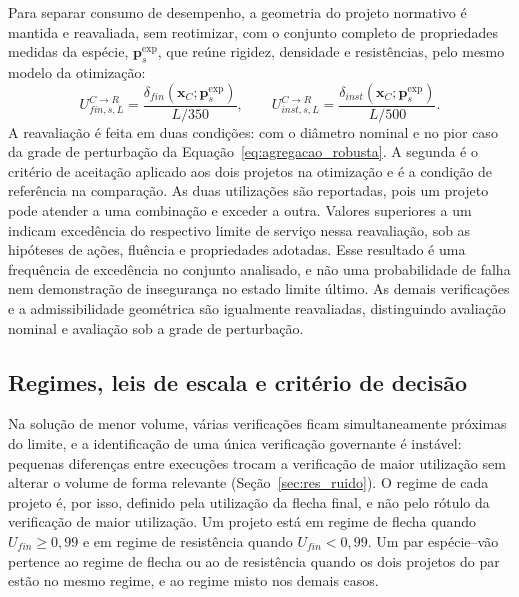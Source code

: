 Para separar consumo de desempenho, a geometria do projeto normativo é mantida e reavaliada, sem reotimizar, com o conjunto completo de propriedades medidas da espécie, $\mathbf{p}_s^{\mathrm{exp}}$, que reúne rigidez, densidade e resistências, pelo mesmo modelo da otimização:
\begin{equation}
U_{fin,s,L}^{C\rightarrow R}=\frac{\delta_{fin}(\mathbf{x}_C;\mathbf{p}_s^{\mathrm{exp}})}{L/350},
\qquad
U_{inst,s,L}^{C\rightarrow R}=\frac{\delta_{inst}(\mathbf{x}_C;\mathbf{p}_s^{\mathrm{exp}})}{L/500}.
\label{eq:reavaliacao}
\end{equation}
A reavaliação é feita em duas condições: com o diâmetro nominal e no pior caso da grade de perturbação da Equação~\eqref{eq:agregacao_robusta}. A segunda é o critério de aceitação aplicado aos dois projetos na otimização e é a condição de referência na comparação.
As duas utilizações são reportadas, pois um projeto pode atender a uma combinação e exceder a outra. Valores superiores a um indicam excedência do respectivo limite de serviço nessa reavaliação, sob as hipóteses de ações, fluência e propriedades adotadas. Esse resultado é uma frequência de excedência no conjunto analisado, e não uma probabilidade de falha nem demonstração de insegurança no estado limite último. As demais verificações e a admissibilidade geométrica são igualmente reavaliadas, distinguindo avaliação nominal e avaliação sob a grade de perturbação.

\subsection{Regimes, leis de escala e critério de decisão}\label{sec:escala}

Na solução de menor volume, várias verificações ficam simultaneamente próximas do limite, e a identificação de uma única verificação governante é instável: pequenas diferenças entre execuções trocam a verificação de maior utilização sem alterar o volume de forma relevante (Seção~\ref{sec:res_ruido}). O regime de cada projeto é, por isso, definido pela utilização da flecha final, e não pelo rótulo da verificação de maior utilização. Um projeto está em regime de flecha quando $U_{fin}\geq0{,}99$ e em regime de resistência quando $U_{fin}<0{,}99$. Um par espécie--vão pertence ao regime de flecha ou ao de resistência quando os dois projetos do par estão no mesmo regime, e ao regime misto nos demais casos.

